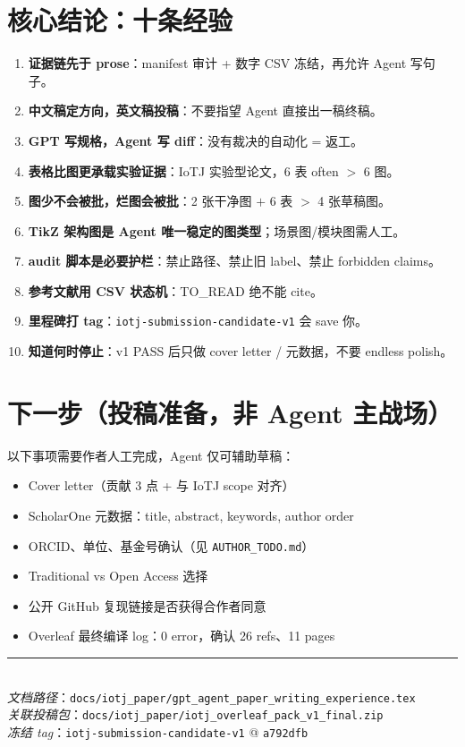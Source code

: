 \documentclass[11pt,a4paper]{ctexart}
\newcommand{\paperdir}{\texttt{docs/iotj\_paper/}}
\begin{document}
\section{核心结论：十条经验}

\begin{enumerate}
  \item \textbf{证据链先于 prose}：manifest 审计 + 数字 CSV 冻结，再允许 Agent 写句子。
  \item \textbf{中文稿定方向，英文稿投稿}：不要指望 Agent 直接出一稿终稿。
  \item \textbf{GPT 写规格，Agent 写 diff}：没有裁决的自动化 = 返工。
  \item \textbf{表格比图更承载实验证据}：IoTJ 实验型论文，6 表 often $>$ 6 图。
  \item \textbf{图少不会被批，烂图会被批}：2 张干净图 $+$ 6 表 $>$ 4 张草稿图。
  \item \textbf{TikZ 架构图是 Agent 唯一稳定的图类型}；场景图/模块图需人工。
  \item \textbf{audit 脚本是必要护栏}：禁止路径、禁止旧 label、禁止 forbidden claims。
  \item \textbf{参考文献用 CSV 状态机}：TO\_READ 绝不能 cite。
  \item \textbf{里程碑打 tag}：\texttt{iotj-submission-candidate-v1} 会 save 你。
  \item \textbf{知道何时停止}：v1 PASS 后只做 cover letter / 元数据，不要 endless polish。
\end{enumerate}

\section{下一步（投稿准备，非 Agent 主战场）}

以下事项需要作者人工完成，Agent 仅可辅助草稿：
\begin{itemize}
  \item Cover letter（贡献 3 点 + 与 IoTJ scope 对齐）
  \item ScholarOne 元数据：title, abstract, keywords, author order
  \item ORCID、单位、基金号确认（见 \texttt{AUTHOR\_TODO.md}）
  \item Traditional vs Open Access 选择
  \item 公开 GitHub 复现链接是否获得合作者同意
  \item Overleaf 最终编译 log：0 error，确认 26 refs、11 pages
\end{itemize}

\vfill
\noindent\rule{\textwidth}{0.4pt}\\
\small
\textit{文档路径}：\paperdir\texttt{gpt\_agent\_paper\_writing\_experience.tex}\\
\textit{关联投稿包}：\paperdir\texttt{iotj\_overleaf\_pack\_v1\_final.zip}\\
\textit{冻结 tag}：\texttt{iotj-submission-candidate-v1} @ \texttt{a792dfb}
\end{document}
